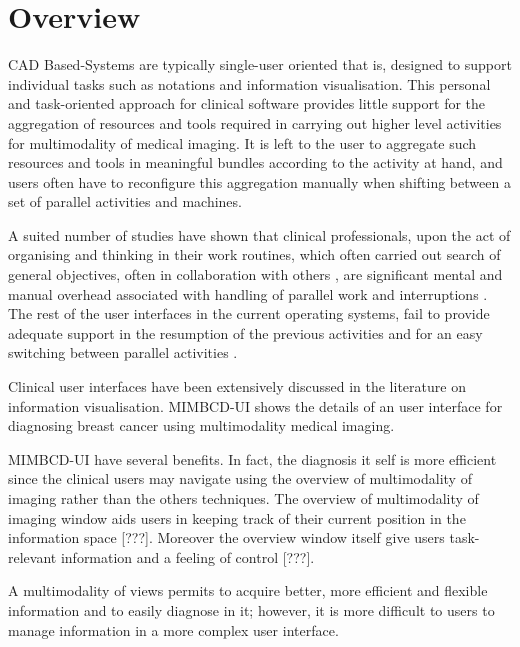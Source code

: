 
\chapter{Overview}
\label{chapter:overview}

CAD Based-Systems are typically single-user oriented that is, designed to support individual tasks such as notations and information visualisation. This personal and task-oriented approach for clinical software provides little support for the aggregation of resources and tools required in carrying out higher level activities for multimodality of medical imaging. It is left to the user to aggregate such resources and tools in meaningful bundles according to the activity at hand, and users often have to reconfigure this aggregation manually when shifting between a set of parallel activities and machines.

A  suited  number  of  studies  have  shown  that  clinical  professionals, upon the act of organising and thinking in their work routines, which often carried out search of general objectives, often in collaboration with others \cite{Bardram04realtimecollaboration, citeulike:1090639, Mark05notask}, are significant mental and manual overhead associated with handling of  parallel  work  and  interruptions \cite{Czerwinski04adiary, Smith03groupbar:the}. The rest of the user  interfaces  in  the  current operating systems, fail to provide adequate support in the resumption of the previous  activities  and  for an  easy  switching  between  parallel  activities \cite{Robertson04scalablefabric:, Robertson00thetask}.

Clinical user interfaces have been extensively discussed in the literature on information visualisation. MIMBCD-UI shows the details of an user interface for diagnosing breast cancer using multimodality medical imaging.

MIMBCD-UI have several benefits. In fact, the diagnosis it self is more efficient since the clinical users may navigate using the overview of multimodality of imaging rather than the others techniques. The overview of multimodality of imaging window aids users in keeping track of their current position in the information space [???]. Moreover the overview window itself give users task-relevant information and a feeling of control [???].

A multimodality of views permits to acquire better, more efficient and flexible information and to easily diagnose in it; however, it is more difficult to users to manage information in a more complex user interface.

